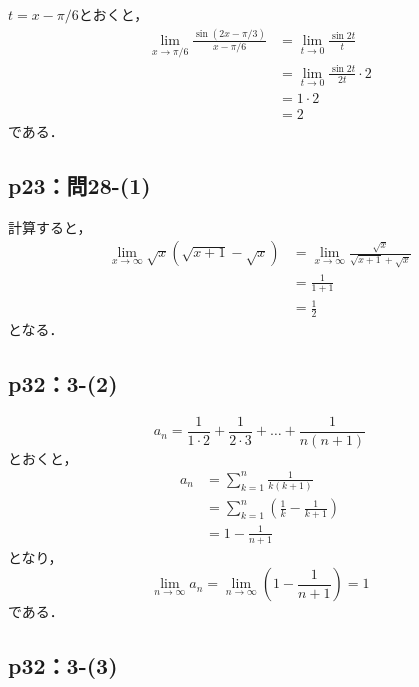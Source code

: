 \documentclass[uplatex,dvipdfmx,a4paper,10pt,fleqn]{jsarticle}
\begin{document}
\begin{tleftbar}
    $t = x - \pi/6$とおくと，
    \begin{align*} 
        \lim_{x \to \pi/6} \frac{\sin (2x-\pi/3)}{x - \pi/6} & = \lim_{t \to 0} \frac{\sin 2 t}{t} \\
        & = \lim_{t \to 0} \frac{\sin 2t}{2t} \cdot 2 \\
        & = 1 \cdot 2 \\
        & = 2 
    \end{align*} 
    である．
\end{tleftbar}




\subsection*{p23：問28-(1)}

\begin{tleftbar}
    計算すると，
    \begin{align*} 
        \lim_{x \to \infty} \sqrt{x}(\sqrt{x+1}-\sqrt{x}) & = \lim_{x \to \infty} \frac{\sqrt{x}}{\sqrt{x+1}+\sqrt{x}} \\
        & = \frac{1}{1+1} \\
        & = \frac{1}{2}
    \end{align*}
    となる．
\end{tleftbar}


\subsection*{p32：3-(2)}

\begin{tleftbar}
    \[
        a_n = \frac{1}{1 \cdot 2}+\frac{1}{2 \cdot 3} + \dots + \frac{1}{n(n+1)}
    \]
    とおくと，
    \begin{align*} 
       a_n & =  \sum_{k=1}^{n} \frac{1}{k(k+1)} \\
       & = \sum_{k=1}^{n} \left ( \frac{1}{k} - \frac{1}{k+1} \right ) \\
       & = 1-\frac{1}{n+1}
    \end{align*} 
    となり，
    \[
        \lim_{n \to \infty} a_n = \lim_{n \to \infty} \left ( 1-\frac{1}{n+1} \right) =1
    \]
    である．
\end{tleftbar}


\subsection*{p32：3-(3)}
\end{document}
